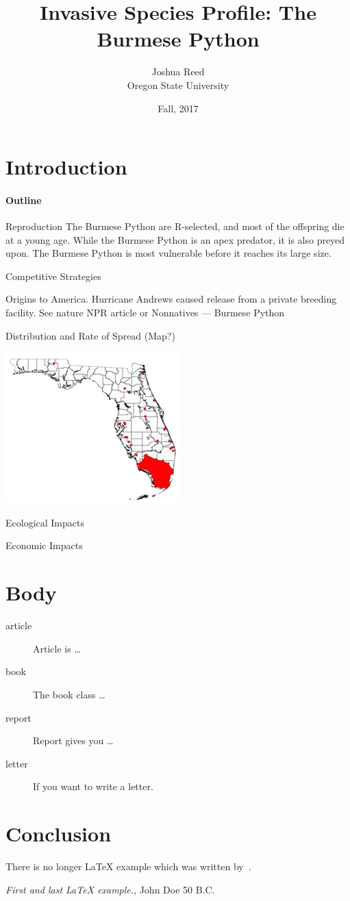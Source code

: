 \documentclass{article}
\title{Invasive Species Profile: The Burmese Python}
\author{Joshua Reed \\ Oregon State University}
\date{Fall, 2017}
\begin{document}
\maketitle

\section*{Introduction}

\paragraph{Outline}
Reproduction
The Burmese Python are R-selected, and most of the offspring die at a young age. While the Burmese Python is an apex predator, it is also preyed upon. The
Burmese Python is most vulnerable before it reaches its large size. 

Competitive Strategies


Origins to America. Hurricane Andrews caused release from a private breeding facility. See nature NPR article or Nonnatives --- Burmese Python

Distribution and Rate of Spread (Map?)
\begin{centering}
\includegraphics[scale=0.5]{Burm-Florida-range-map.png}
\end{centering}

Ecological Impacts

Economic Impacts



\section*{Body}\label{documentclasses}

\begin{description}
\item[article\label{article}]{Article is \ldots}
\item[book\label{book}]{The book class \ldots}
\item[report\label{report}]{Report gives you \ldots}
\item[letter\label{letter}]{If you want to write a letter.}
\end{description}


\section*{Conclusion}\label{conclusions}
There is no longer \LaTeX{} example which was written by~\cite{doe}.


\begin{thebibliography}{9}
 \emph{First and last \LaTeX{} example.},
John Doe 50 B.C. 
\end{thebibliography}
\end{document}
